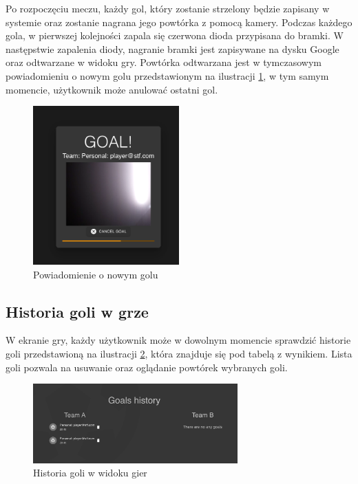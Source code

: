 Po rozpoczęciu meczu, każdy gol, który zostanie strzelony będzie zapisany w systemie oraz zostanie nagrana jego powtórka z pomocą kamery. Podczas każdego gola, w pierwszej kolejności zapala się czerwona dioda przypisana do bramki. W następstwie zapalenia diody, nagranie bramki jest zapisywane na dysku Google oraz odtwarzane w widoku gry. Powtórka odtwarzana jest w tymczasowym powiadomieniu o nowym golu przedstawionym na ilustracji \ref{fig:newGoal}, w tym samym momencie, użytkownik może anulować ostatni gol.

\begin{figure}[h!]
  \centering
    \includegraphics[width=0.5\textwidth]{images/player/newgoal.png}
  \caption{Powiadomienie o nowym golu}
  \label{fig:newGoal}
\end{figure}

\subsection{Historia goli w grze}
W ekranie gry, każdy użytkownik może w dowolnym momencie sprawdzić historie goli przedstawioną na ilustracji \ref{fig:goals-history}, która znajduje się pod tabelą z wynikiem. Lista goli pozwala na usuwanie oraz oglądanie powtórek wybranych goli.

\begin{figure}[h!]
  \centering
    \includegraphics[width=0.7\textwidth]{images/player/goals history.png}
  \caption{Historia goli w widoku gier}
  \label{fig:goals-history}
\end{figure}

